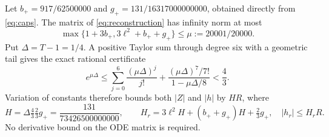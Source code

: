 \documentclass[11pt]{article}
\begin{document}
Let $b_+=917/62500000$ and $g_+=131/16317000000000$, obtained directly
from \eqref{eq:caps}. The matrix of \eqref{eq:reconstruction} has
infinity norm at most
\begin{equation}
 \max\{1+3b_+,3\ell^2+b_++g_+\}\le\mu:=20001/20000.
 \label{eq:matrixbound}
\end{equation}
Put $\Delta=T-1=1/4$. A positive Taylor sum through degree six with a
geometric tail gives the exact rational certificate
\begin{equation}
 e^{\mu\Delta}\le
 \sum_{j=0}^6\frac{(\mu\Delta)^j}{j!}
 +\frac{(\mu\Delta)^7/7!}{1-\mu\Delta/8}<\frac43.
 \label{eq:exponential}
\end{equation}
Variation of constants therefore bounds both $|Z|$ and $|h|$ by $HR$,
where
\begin{equation}
 H=\Delta\tfrac43\tfrac23g_+=\frac{131}{73426500000000},\qquad
 H_r=3\ell^2H+(b_++g_+)H+\tfrac23g_+,
 \quad |h_r|\le H_rR.
 \label{eq:hbound}
\end{equation}
No derivative bound on the ODE matrix is required.
\end{document}
